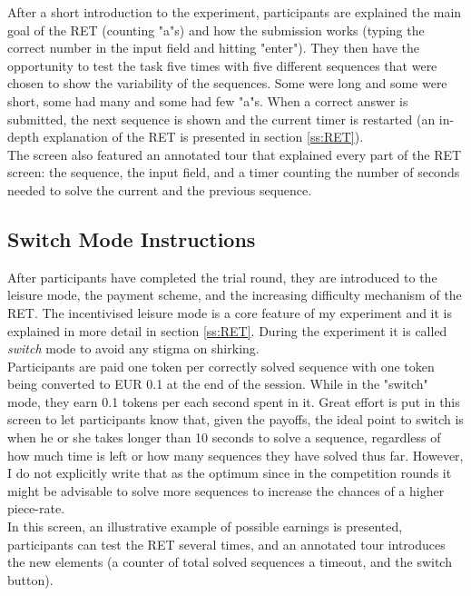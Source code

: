     After a short introduction to the experiment, participants are explained the main goal of the RET (counting "a"s) and how the submission works (typing the correct number in the input field and hitting "enter"). They then have the opportunity to test the task five times with five different sequences that were chosen to show the variability of the sequences. Some were long and some were short, some had many and some had few "a"s. When a correct answer is submitted, the next sequence is shown and the current timer is restarted (an in-depth explanation of the RET is presented in section \ref{ss:RET}). \\
    
    The screen also featured an annotated tour that explained every part of the RET screen: the sequence, the input field, and a timer counting the number of seconds needed to solve the current and the previous sequence.\\
    
    \subsection{Switch Mode Instructions}
    
    After participants have completed the trial round, they are introduced to the leisure mode, the payment scheme, and the increasing difficulty mechanism of the RET. The incentivised leisure mode is a core feature of my experiment and it is explained in more detail in section \ref{ss:RET}. During the experiment it is called \textit{switch} mode to avoid any stigma on shirking.\\
    
    Participants are paid one token per correctly solved sequence with one token being converted to EUR 0.1 at the end of the session. While in the "switch" mode, they earn 0.1 tokens per each second spent in it. Great effort is put in this screen to let participants know that, given the payoffs, the ideal point to switch is when he or she takes longer than 10 seconds to solve a sequence, regardless of how much time is left or how many sequences they have solved thus far. However, I do not explicitly write that as the optimum since in the competition rounds it might be advisable to solve more sequences to increase the chances of a higher piece-rate.\\
    
    In this screen, an illustrative example of possible earnings is presented, participants can test the RET several times, and an annotated tour introduces the new elements (a counter of total solved sequences a timeout, and the switch button).
    
